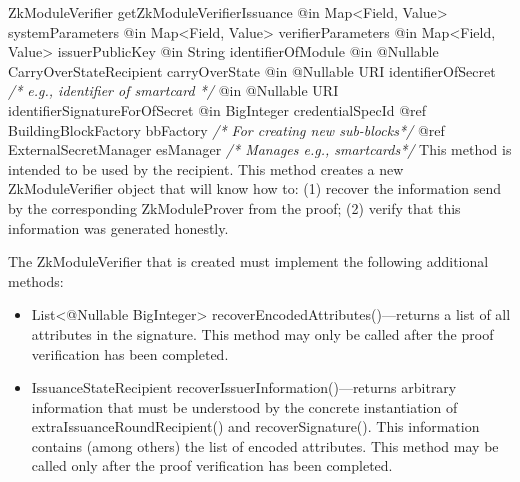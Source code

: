       \begin{method}
      {ZkModuleVerifier}
      {getZkModuleVerifierIssuance}
      {
        {@in Map<Field, Value> systemParameters}
        {@in Map<Field, Value> verifierParameters}
        {@in Map<Field, Value> issuerPublicKey}
        {@in String identifierOfModule}
        {@in @Nullable CarryOverStateRecipient carryOverState}
        {@in @Nullable URI identifierOfSecret \textrm{\emph{/* e.g., identifier of smartcard */}}}
        {@in @Nullable URI identifierSignatureForOfSecret}
        {@in BigInteger credentialSpecId}
        {@ref BuildingBlockFactory bbFactory \textrm{\emph{/* For creating new sub-blocks*/}}}
        {@ref ExternalSecretManager esManager \textrm{\emph{/* Manages e.g., smartcards*/}}}
      }
      This method is intended to be used by the recipient.
      This method creates a new ZkModuleVerifier object that will know how to:
      (1) recover the information send by the corresponding ZkModuleProver from the proof;
      (2) verify that this information was generated honestly.

      The ZkModuleVerifier that is created must implement the following additional methods:
        \begin{itemize}
          \item List<@Nullable BigInteger> recoverEncodedAttributes()---returns a list of all attributes
                in the signature. This method may only be called after the proof verification has been completed.
          \item IssuanceStateRecipient recoverIssuerInformation()---returns arbitrary information that must be
                understood by the concrete instantiation of extraIssuanceRoundRecipient() and recoverSignature().
                This information contains (among others) the list of encoded attributes.
                This method may be called only after the proof verification has been completed.
        \end{itemize}
      \end{method}
